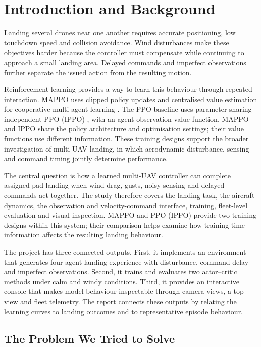 \hypertarget{introduction-and-background}{%
\section{Introduction and Background}\label{introduction-and-background}}

Landing several drones near one another requires accurate positioning, low touchdown speed and collision avoidance. Wind disturbances make these objectives harder because the controller must compensate while continuing to approach a small landing area. Delayed commands and imperfect observations further separate the issued action from the resulting motion.

Reinforcement learning provides a way to learn this behaviour through repeated interaction. MAPPO uses clipped policy updates \cite{ppo2017} and centralised value estimation for cooperative multi-agent learning \cite{mappo2022}. The PPO baseline uses parameter-sharing independent PPO (IPPO) \cite{ppo2017}, with an agent-observation value function. MAPPO and IPPO share the policy architecture and optimisation settings; their value functions use different information. These training designs support the broader investigation of multi-UAV landing, in which aerodynamic disturbance, sensing and command timing jointly determine performance.

The central question is how a learned multi-UAV controller can complete assigned-pad landing when wind drag, gusts, noisy sensing and delayed commands act together. The study therefore covers the landing task, the aircraft dynamics, the observation and velocity-command interface, training, fleet-level evaluation and visual inspection. MAPPO and PPO (IPPO) provide two training designs within this system; their comparison helps examine how training-time information affects the resulting landing behaviour.

The project has three connected outputs. First, it implements an environment that generates four-agent landing experience with disturbance, command delay and imperfect observations. Second, it trains and evaluates two actor--critic methods under calm and windy conditions. Third, it provides an interactive console that makes model behaviour inspectable through camera views, a top view and fleet telemetry. The report connects these outputs by relating the learning curves to landing outcomes and to representative episode behaviour.

\hypertarget{the-problem-we-tried-to-solve}{%
\subsection{The Problem We Tried to Solve}\label{the-problem-we-tried-to-solve}}

